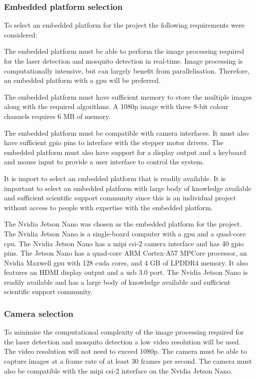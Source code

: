 \subsubsection{Embedded platform selection}
To select an embedded platform for the project the following requirements were considered:
\begin{description}[style=nextline]
    \item[Processing power] The embedded platform must be able to perform the image processing required for the laser detection and mosquito detection in real-time. Image processing is computationally intensive, but can largely benefit from parallelisation. Therefore, an embedded platform with a \gls{gpu} will be preferred.
    \item[Memory] The embedded platform must have sufficient memory to store the multiple images along with the required algorithms. A 1080p image with three 8-bit colour channels requires 6 MB of memory.
    \item[Hardware interfaces] The embedded platform must be compatible with camera interfaces. It must also have sufficient \gls{gpio} pins to interface with the stepper motor drivers. The embedded platform must also have support for a display output and a keyboard and mouse input to provide a user interface to control the system.
    \item[Availability and support] It is import to select an embedded platform that is readily available. It is important to select an embedded platform with large body of knowledge available and sufficient scientific support community since this is an individual project without access to people with expertise with the embedded platform.
\end{description}

The Nvidia Jetson Nano was chosen as the embedded platform for the project. The Nvidia Jetson Nano is a single-board computer with a \gls{gpu} and a quad-core \gls{cpu}. The Nvidia Jetson Nano has a \gls{mipi} \gls{csi}-2 camera interface and has 40 \gls{gpio} pins. The Jetson Nano has a quad-core ARM Cortex-A57 MPCore processor, an Nvidia Maxwell \gls{gpu} with 128 \gls{cuda} cores, and 4 GB of LPDDR4 memory. It also features an HDMI display output and a \gls{usb} 3.0 port. The Nvidia Jetson Nano is readily available and has a large body of knowledge available and sufficient scientific support community.



\subsubsection{Camera selection}
To minimise the computational complexity of the image processing required for the laser detection and mosquito detection a low video resolution will be used. The video resolution will not need to exceed 1080p. The camera must be able to capture images at a frame rate of at least 30 frames per second. The camera must also be compatible with the \gls{mipi} \gls{csi}-2 interface on the Nvidia Jetson Nano.

